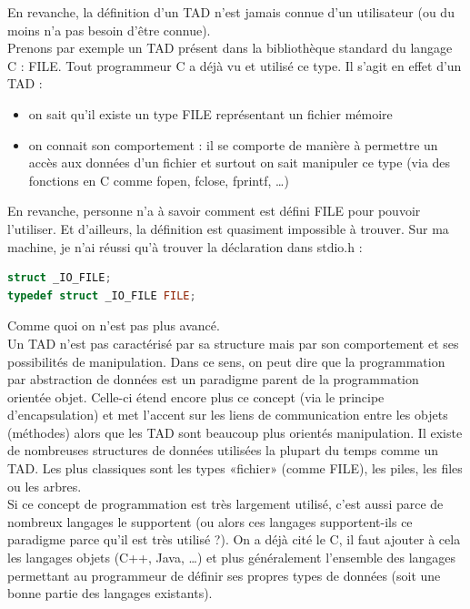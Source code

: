 En revanche, la définition d'un TAD n'est jamais connue d'un utilisateur (ou du moins n'a pas besoin d'être connue).\\

Prenons par exemple un TAD présent dans la bibliothèque standard du langage C : FILE.
Tout programmeur C a déjà vu et utilisé ce type. Il s'agit en effet d'un TAD :
\begin{itemize}
\item on sait qu'il existe un type FILE représentant un fichier mémoire
\item on connait son comportement : il se comporte de manière à permettre un accès aux données d'un fichier et surtout on sait manipuler ce type (via des fonctions en C comme fopen, fclose, fprintf, …)\\
\end{itemize}

En revanche, personne n'a à savoir comment est défini FILE pour pouvoir l'utiliser. Et d'ailleurs, la définition est quasiment impossible à trouver. Sur ma machine, je n'ai réussi qu'à trouver la déclaration dans stdio.h :

\begin{lstlisting}[language=c]
struct _IO_FILE;
typedef struct _IO_FILE FILE;
\end{lstlisting}

Comme quoi on n'est pas plus avancé.\\

Un TAD n'est pas caractérisé par sa structure mais par son comportement et ses possibilités de manipulation. Dans ce sens, on peut dire que la programmation par abstraction de données est un paradigme parent de la programmation orientée objet. Celle-ci étend encore plus ce concept (via le principe d'encapsulation) et met l'accent sur les liens de communication entre les objets (méthodes) alors que les TAD sont beaucoup plus orientés manipulation. Il existe de nombreuses structures de données utilisées la plupart du temps comme un TAD. Les plus classiques sont les types «fichier» (comme FILE), les piles, les files ou les arbres.\\

Si ce concept de programmation est très largement utilisé, c'est aussi parce de nombreux langages le supportent (ou alors ces langages supportent-ils ce paradigme parce qu'il est très utilisé ?). On a déjà cité le C, il faut ajouter à cela les langages objets (C++, Java, …) et plus généralement l'ensemble des langages permettant au programmeur de définir ses propres types de données (soit une bonne partie des langages existants). \cite{bib_univnc}

